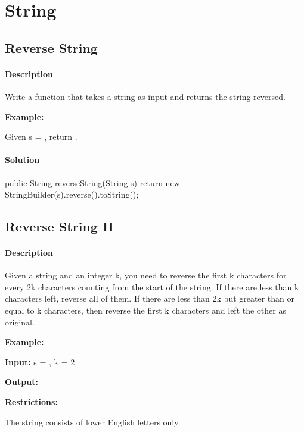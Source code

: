 \chapter{String}

\section{Reverse String} %

\subsubsection{Description}
Write a function that takes a string as input and returns the string reversed.

\textbf{Example:}

Given s = , return .

\subsubsection{Solution}

\begin{Code}
public String reverseString(String s) {
    return new StringBuilder(s).reverse().toString();
}
\end{Code}

\newpage

\section{Reverse String II} %

\subsubsection{Description}
Given a string and an integer k, you need to reverse the first k characters for every 2k characters counting from the start of the string. If there are less than k characters left, reverse all of them. If there are less than 2k but greater than or equal to k characters, then reverse the first k characters and left the other as original.

\textbf{Example:}

\textbf{Input:} s = , k = 2

\textbf{Output:} 

\textbf{Restrictions:}

The string consists of lower English letters only.

